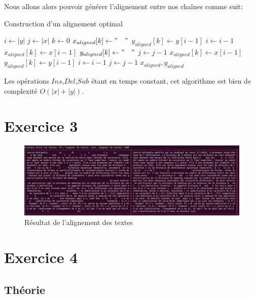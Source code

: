 \documentclass{article}
\begin{document}
Nous allons alors pouvoir générer l'alignement entre nos chaînes comme suit:
\begin{algorithm}
\caption{Construction d'un alignement optimal}\label{algo:alignement}
\begin{algorithmic}[1]
	\State $i \gets  \lvert y \rvert $	
	\State $j \gets  \lvert x \rvert $	
	\State $k \gets 0$
			\State $x_{aligned}[k] \gets "\quad"$
			\State $y_{aligned}[k] \gets y[i-1]$
			\State $i \gets i-1$
			\State $x_{aligned}[k] \gets x[i-1]$
			\State $y_{aligned}[k] \gets "\quad"$
			\State $j \gets j-1$
			\State $x_{aligned}[k] \gets x[i-1]$
			\State $y_{aligned}[k] \gets y[i-1]$
			\State $i \gets i-1$
			\State $j \gets j-1$
		\EndIf
	\EndWhile	
	\State\Return $x_{aligned}, y_{aligned}$
\EndProcedure
\end{algorithmic}
\end{algorithm}

Les opérations $Ins$,$Del$,$Sub$ étant en temps constant, cet algorithme est 
bien de complexité $O(\lvert x\rvert+\lvert y\rvert)$.

\section{Exercice 3}

\begin{figure}[!hbt]
	\centering
	\includegraphics[width=0.95\linewidth]{./images/exo3.png}
	\caption{Résultat de l'alignement des textes}%
	\label{fig:exo3}
\end{figure}
\section{Exercice 4}
\subsection{Théorie}
\end{document}
